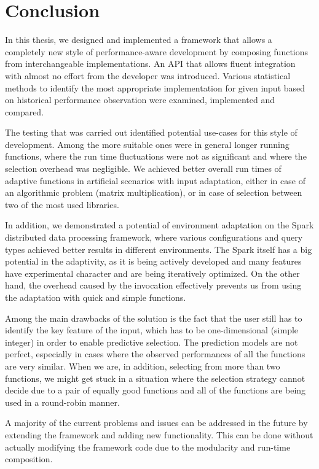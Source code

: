 \chapter*{Conclusion}

In this thesis, we designed and implemented a framework that allows a completely new style of performance-aware development by composing functions from interchangeable implementations. An API that allows fluent integration with almost no effort from the developer was introduced. Various statistical methods to identify the most appropriate implementation for given input based on historical performance observation were examined, implemented and compared.

The testing that was carried out identified potential use-cases for this style of development. Among the more suitable ones were in general longer running functions, where the run time fluctuations were not as significant and where the selection overhead was negligible. We achieved better overall run times of adaptive functions in artificial scenarios with input adaptation, either in case of an algorithmic problem (matrix multiplication), or in case of selection between two of the most used libraries.

In addition, we demonstrated a potential of environment adaptation on the Spark distributed data processing framework, where various configurations and query types achieved better results in different environments. The Spark itself has a big potential in the adaptivity, as it is being actively developed and many features have experimental character and are being iteratively optimized. On the other hand, the overhead caused by the invocation effectively prevents us from using the adaptation with quick and simple functions.

Among the main drawbacks of the solution is the fact that the user still has to identify the key feature of the input, which has to be one-dimensional (simple integer) in order to enable predictive selection. The prediction models are not perfect, especially in cases where the observed performances of all the functions are very similar. When we are, in addition, selecting from more than two functions, we might get stuck in a situation where the selection strategy cannot decide due to a pair of equally good functions and all of the functions are being used in a round-robin manner.

A majority of the current problems and issues can be addressed in the future by extending the framework and adding new functionality. This can be done without actually modifying the framework code due to the modularity and run-time composition.

